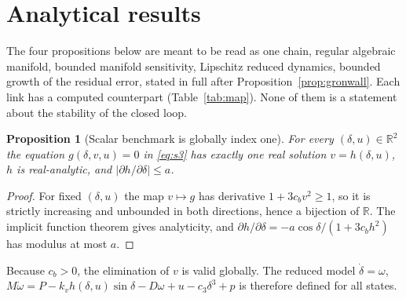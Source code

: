\documentclass[preprint,12pt]{elsarticle}
\newtheorem{proposition}{Proposition}
\newcommand{\RR}{\mathbb{R}}
\begin{document}
\section{Analytical results}
\label{sec:theory}
The four propositions below are meant to be read as one chain, regular algebraic manifold, bounded manifold sensitivity, Lipschitz reduced dynamics, bounded growth of the residual error, stated in full after Proposition~\ref{prop:gronwall}. Each link has a computed counterpart (Table~\ref{tab:map}). None of them is a statement about the stability of the closed loop.

\begin{proposition}[Scalar benchmark is globally index one]
\label{prop:scalar}
For every $(\delta,u)\in\RR^2$ the equation $g(\delta,v,u)=0$ in \eqref{eq:s3} has exactly one real solution $v=h(\delta,u)$, $h$ is real-analytic, and $|\partial h/\partial\delta|\le a$.
\end{proposition}
\begin{proof}
For fixed $(\delta,u)$ the map $v\mapsto g$ has derivative $1+3c_bv^2\ge1$, so it is strictly increasing and unbounded in both directions, hence a bijection of $\RR$. The implicit function theorem gives analyticity, and $\partial h/\partial\delta=-a\cos\delta/(1+3c_bh^2)$ has modulus at most $a$.
\end{proof}
Because $c_b>0$, the elimination of $v$ is valid globally. The reduced model $\dot\delta=\omega$, $M\dot\omega=P-k_vh(\delta,u)\sin\delta-D\omega+u-c_3\delta^3+p$ is therefore defined for all states.
\end{document}
